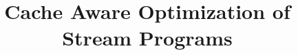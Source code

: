 \documentclass{sig-alternate}
\title{Cache Aware Optimization of Stream Programs}
\begin{document}
\maketitle

\begin{abstract}

\end{abstract}








{\small
  
  
}
\end{document}
